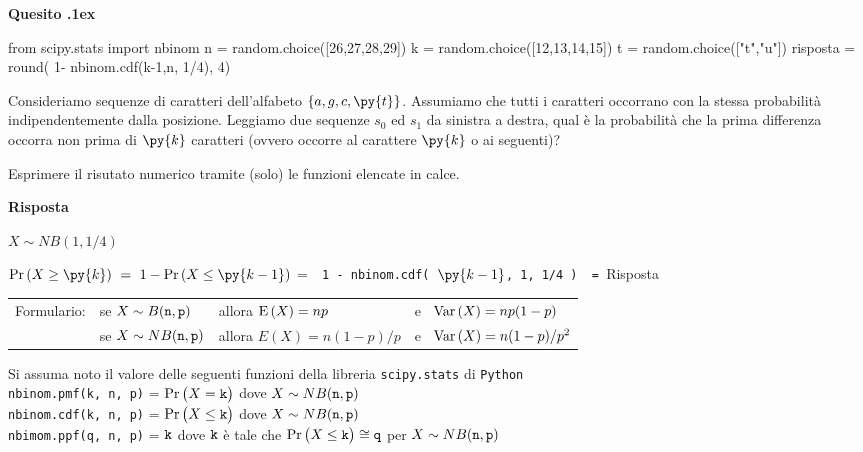 \documentclass[11pt,twoside,a4paper]{article}
\def\Ex{{\rm E\,}}
\def\Var{{\rm Var\,}}
\newcounter{quesito}
\newenvironment{question}{\bigskip\addtocounter{quesito}{1}\bigskip\bigskip\par\textbf{Quesito \thequesito.\kern1ex}}{\vspace{\parskip}}
\newenvironment{answer}{\par\textbf{Risposta\quad}}{\vspace{\parskip}}
\begin{document}
\begin{question}
\begin{pycode}
from scipy.stats import nbinom
n = random.choice([26,27,28,29])
k = random.choice([12,13,14,15])
t = random.choice(["t","u"])
risposta = round( 1- nbinom.cdf(k-1,n, 1/4), 4)
\end{pycode}
Consideriamo sequenze di caratteri dell'alfabeto $\{a,g,c,\py{t}\}$. 
Assumiamo che tutti i caratteri occorrano con la stessa probabilità indipendentemente dalla posizione.
Leggiamo due sequenze $s_0$ ed $s_1$ da sinistra a destra, qual è la probabilità che la prima differenza occorra non prima di $\py{k}$ caratteri (ovvero occorre al carattere  $\py{k}$ o ai seguenti)?   

Esprimere il risutato numerico tramite (solo) le funzioni elencate in calce.
\begin{answer}
    
  $X\sim NB(1, 1/4)$
  
  $\Pr(X\ge \py{k})\ =\ 1-\Pr(X\le \py{k-1})$
  \quad =\ 
  {\tt{\color{blue}  1 -  nbinom.cdf( $\py{k-1}$, 1, 1/4 )}
  \ =\ 
  }{\color{blue}\hfill Risposta}
\end{answer}
\end{question}

\vfill
\hrulefill

\begin{tabular}{@{}llll}
Formulario:& se $X\sim B({\tt n},{\tt p})$ & allora $\Ex(X)=np$&e \ $\Var(X)=np(1-p)$\\
           & se $X\sim NB({\tt n},{\tt p})$& allora $E(X)=n(1-p)/p$&e \ $\Var(X)=n(1-p)/p^2$\\
\end{tabular}

Si assuma noto il valore delle seguenti funzioni della libreria {\tt scipy.stats\/} di  {\tt Python\/}\\
{\tt nbinom.pmf(k, n, p)} = $\Pr\big(X={\tt k}\big)$ dove $X\sim NB({\tt n},{\tt p})$\\
{\tt nbinom.cdf(k, n, p)} = $\Pr\big(X\le{\tt k}\big)$ dove  $X\sim NB({\tt n},{\tt p})$ \\
{\tt nbimom.ppf(q, n, p)} = ${\tt k}$ dove ${\tt k}$ è tale che $\Pr\big(X\le{\tt k}\big)\cong{\tt q}$ per $X\sim NB({\tt n},{\tt p})$ 
\end{document}
